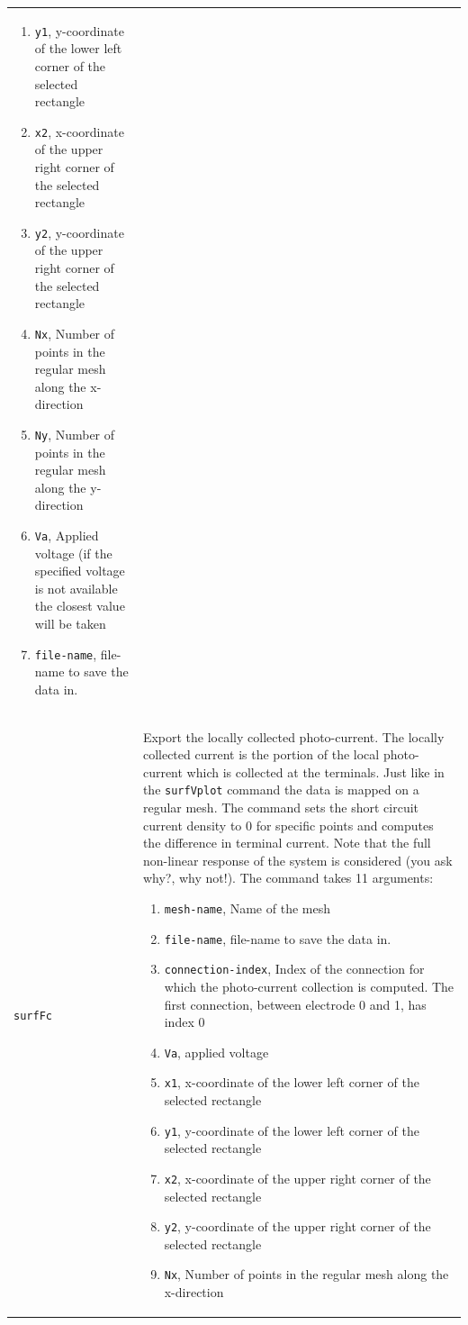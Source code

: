\documentclass[noshowpacs,preprintnumbers,amsmath,amssymb, letter]{revtex4}
\begin{document}
\begin{longtable}{p{}p{}}
\begin{enumerate}
\item \texttt{y1}, y-coordinate of the lower left corner of the selected rectangle
\item \texttt{x2}, x-coordinate of the upper right corner of the selected rectangle
\item \texttt{y2}, y-coordinate of the upper right corner of the selected rectangle
\item \texttt{Nx}, Number of points in the regular mesh along the x-direction
\item \texttt{Ny}, Number of points in the regular mesh along the y-direction
\item \texttt{Va}, Applied voltage (if the specified voltage is not available the closest value will be taken
\item \texttt{file-name}, file-name to save the data in.
\end{enumerate}\\
\texttt{surfFc}		& Export the locally collected photo-current. The locally collected current is the portion of the local photo-current which is collected at the terminals. Just like in the \texttt{surfVplot} command the data is mapped on a regular mesh. The command sets the short circuit current density to 0 for specific points and computes the difference in terminal current. Note that the full non-linear response of the system is considered (you ask why?, why not!). The command takes 11 arguments:
\begin{enumerate}
\item \texttt{mesh-name}, Name of the mesh
\item \texttt{file-name}, file-name to save the data in.
\item \texttt{connection-index}, Index of the connection for which the photo-current collection is computed. The first connection, between electrode 0 and 1,  has index 0
\item \texttt{Va}, applied voltage
\item \texttt{x1}, x-coordinate of the lower left corner of the selected rectangle
\item \texttt{y1}, y-coordinate of the lower left corner of the selected rectangle
\item \texttt{x2}, x-coordinate of the upper right corner of the selected rectangle
\item \texttt{y2}, y-coordinate of the upper right corner of the selected rectangle
\item \texttt{Nx}, Number of points in the regular mesh along the x-direction

\end{enumerate}
\end{longtable}
\end{document}
